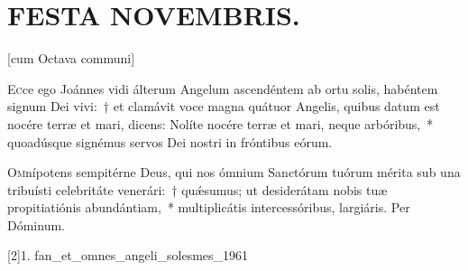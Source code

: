 \documentclass[vesperale_romanum]{subfiles}
\begin{document}
\section[Festa Novembris]{FESTA NOVEMBRIS.}
\label{1_novembris}



[cum Octava communi]



%



\lettrine{E}{c}ce ego Joánnes vidi álterum Angelum ascendéntem ab ortu solis, habéntem signum Dei vivi:~† et clamávit voce magna quátuor Angelis, quibus datum est nocére terræ et mari, dicens: Nolíte nocére terræ et mari, neque arbóribus,~* quoadúsque signémus servos Dei nostri in fróntibus eórum.





\oratio

\lettrine{O}{m}nípotens sempitérne Deus, qui nos ómnium Sanctórum tuórum mérita sub una tribuísti celebritáte venerári:~† quǽsumus; ut desiderátam nobis tuæ propitiatiónis abundántiam,~* multiplicátis intercessóribus, largiáris. Per Dóminum.



[2]{1. f}{an_et_omnes_angeli_solesmes_1961}
\end{document}
